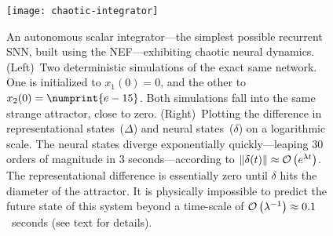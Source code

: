 \begin{figure}
    \centering
    \texttt{[image: chaotic-integrator]}
     
    \caption{\label{fig:chaotic-integrator} 
      An autonomous scalar integrator---the simplest possible recurrent SNN, built using the NEF---exhibiting chaotic neural dynamics.
      (Left)~Two deterministic simulations of the exact same network.
          One is initialized to $x_1(0) = 0$, and the other to $x_2(0) = \numprint{e-15}$.
          Both simulations fall into the same strange attractor, close to zero.
      (Right)~Plotting the difference in representational states~($\Delta$) and neural states~($\delta$) on a logarithmic scale.
          The neural states diverge exponentially quickly---leaping 30 orders of magnitude in 3 seconds---according to $\| \delta(t) \| \approx \mathcal{O}\left({e^{\lambda t}}\right)$.
          The representational difference is essentially zero until $\delta$ hits the diameter of the attractor.
          It is physically impossible to predict the future state of this system beyond a time-scale of $\mathcal{O}\left({\lambda^{-1}}\right) \approx 0.1$~seconds (see text for details).
    }
\end{figure}

